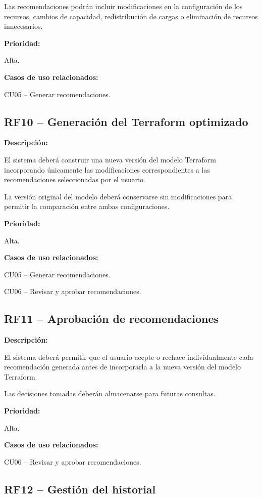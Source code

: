 Las recomendaciones podrán incluir modificaciones en la configuración de los recursos, cambios de capacidad, redistribución de cargas o eliminación de recursos innecesarios.

\noindent \textbf{Prioridad:}

Alta.

\noindent \textbf{Casos de uso relacionados:}

\noindent CU05 -- Generar recomendaciones.

\subsection{RF10 -- Generación del Terraform optimizado}

\noindent \textbf{Descripción:}

El sistema deberá construir una nueva versión del modelo Terraform incorporando únicamente las modificaciones correspondientes a las recomendaciones seleccionadas por el usuario.

La versión original del modelo deberá conservarse sin modificaciones para permitir la comparación entre ambas configuraciones.

\noindent \textbf{Prioridad:}

Alta.

\noindent \textbf{Casos de uso relacionados:}

\noindent CU05 -- Generar recomendaciones.

CU06 -- Revisar y aprobar recomendaciones.

\subsection{RF11 -- Aprobación de recomendaciones}

\noindent \textbf{Descripción:}

El sistema deberá permitir que el usuario acepte o rechace individualmente cada recomendación generada antes de incorporarla a la nueva versión del modelo Terraform.

Las decisiones tomadas deberán almacenarse para futuras consultas.

\noindent \textbf{Prioridad:}

Alta.

\noindent \textbf{Casos de uso relacionados:}

\noindent CU06 -- Revisar y aprobar recomendaciones.

\subsection{RF12 -- Gestión del historial}

